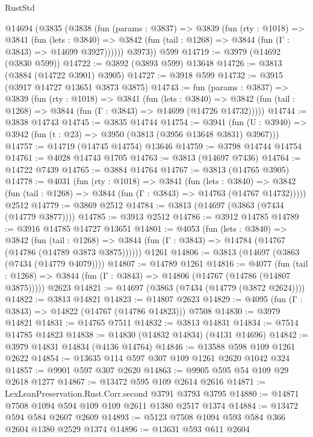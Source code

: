 \begin{lexlean}{RustStd}
\begin{coremodule}
{\begin{coremodule}
{{{{{{{{{{{{{{{{{{{{{{{{{{{{{{{{{{{    @14694
      (@3835
        (@3838
          (fun (params : @3837) =>
          @3839
            (fun (rty : @1018) =>
            @3841
              (fun (lets : @3840) =>
              @3842 (fun (tail : @1268) => @3844 (fun (Γ : @3843) => @14699 @3927))))))
        @3973))
    @599
@14719 := @3979 (@14692 (@3830 @599))
@14722 := @3892 (@3893 @599) @13648
@14726 := @3813 (@3884 (@14722 @3901) @3905)
@14727 := @3918 @599
@14732 := @3915 (@3917 @14727 @13651 @3873 @3875)
@14743 := fun (params : @3837) =>
  @3839
    (fun (rty : @1018) =>
    @3841
      (fun (lets : @3840) =>
      @3842 (fun (tail : @1268) => @3844 (fun (Γ : @3843) => @14699 (@14726 @14732)))))
@14744 := @3838 @14743
@14745 := @3835 @14744
@14754 := @3941
    (fun (U : @3940) => @3942 (fun (t : @23) => @3950 (@3813 (@3956 @13648 @3831) @3967)))
@14757 := @14719 (@14745 @14754) @13646
@14759 := @3798 @14744 @14754
@14761 := @4028 @14743 @1705
@14763 := @3813 (@14697 @7436)
@14764 := @14722 @7439
@14765 := @3884 @14764
@14767 := @3813 (@14765 @3905)
@14778 := @4031
    (fun (rty : @1018) =>
    @3841
      (fun (lets : @3840) =>
      @3842 (fun (tail : @1268) => @3844 (fun (Γ : @3843) => @14763 (@14767 @14732)))))
    @2512
@14779 := @3869 @2512
@14784 := @3813 (@14697 (@3863 (@7434 (@14779 @3877))))
@14785 := @3913 @2512
@14786 := @3912 @14785
@14789 := @3916 @14785 @14727 @13651
@14801 := @4053
    (fun (lets : @3840) =>
    @3842
      (fun (tail : @1268) =>
      @3844 (fun (Γ : @3843) => @14784 (@14767 (@14786 (@14789 @3873 @3875))))))
    @1261
@14806 := @3813 (@14697 (@3863 (@7434 (@14779 @4079))))
@14807 := @14789 @1261
@14816 := @4077
    (fun (tail : @1268) => @3844 (fun (Γ : @3843) => @14806 (@14767 (@14786 (@14807 @3875)))))
    @2623
@14821 := @14697 (@3863 (@7434 (@14779 (@3872 @2624))))
@14822 := @3813 @14821
@14823 := @14807 @2623
@14829 := @4095 (fun (Γ : @3843) => @14822 (@14767 (@14786 @14823))) @7508
@14830 := @3979 @14821
@14831 := @14765 @7511
@14832 := @3813 @14831
@14834 := @7514 @14785 @14823
@14838 := @14830 (@14832 @14834) (@4131 @14696)
@14842 := @3979 @14831 @14834 (@4136 @14764)
@14846 := @13588 @598 @109 @1261 @2622
@14854 := @13635 @114 @597 @307 @109 @1261 @2620 @1042 @324
@14857 := @9901 @597 @307 @2620
@14863 := @9905 @595 @54 @109 @29 @2618 @1277
@14867 := @13472 @595 @109 @2614 @2616
@14871 := LexLeanPreservation.Rust.Corr.second @3791 @3793 @3795
@14880 := @14871 @7508 @1094 @594 @109 @109 @2611 @1380 @2517 @1374
@14884 := @13472 @594 @584 @2607 @2609
@14893 := @5123 @7508 @1094 @593 @584 @366 @2604 @1380 @2529 @1374
@14896 := @13631 @593 @611 @2604
}}}}}}}}}}}}}}}}}}}}}}}}}}}}}}}}}}}
\end{coremodule}}
\end{coremodule}
\end{lexlean}
